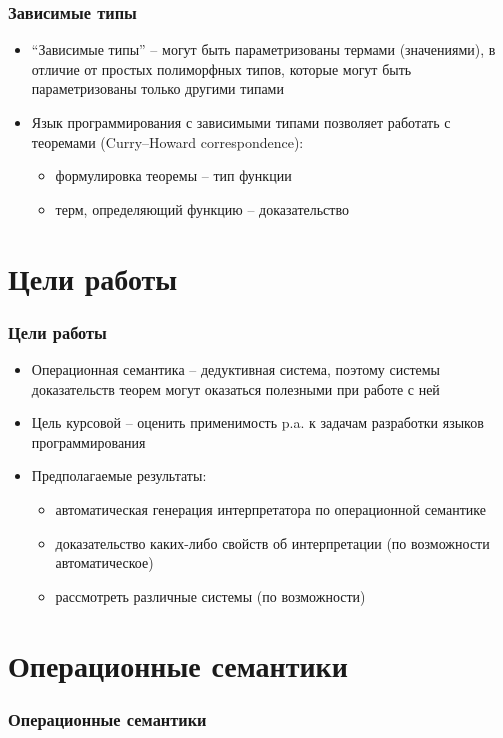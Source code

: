 \documentclass[12pt,pdf,hyperref={unicode}]{beamer}
\begin{document}
      \begin{frame}
         \frametitle{Зависимые типы}
         \begin{itemize}
            \item ``Зависимые типы'' -- могут быть параметризованы термами (значениями),
             в отличие от простых полиморфных типов, которые могут быть
             параметризованы только другими типами
            \item Язык программирования с зависимыми типами позволяет работать
             с теоремами (Curry--Howard correspondence):
               \begin{itemize}
                  \item формулировка теоремы -- тип функции
                  \item терм, определяющий функцию -- доказательство
               \end{itemize}
         \end{itemize}
      \end{frame}

      \section{Цели работы}
      \begin{frame}
         \frametitle{Цели работы}
         \begin{itemize}
            \item Операционная семантика -- дедуктивная система, поэтому
             системы доказательств теорем могут оказаться полезными при работе с ней
            \item Цель курсовой -- оценить применимость p.a. к задачам разработки языков программирования
            \item Предполагаемые результаты:
            \begin{itemize}
               \item автоматическая генерация интерпретатора по операционной семантике
               \item доказательство каких-либо свойств об интерпретации (по возможности автоматическое)
               \item рассмотреть различные системы (по возможности)
            \end{itemize}
         \end{itemize}
      \end{frame}

      \section{Операционные семантики}
      \begin{frame}
         \frametitle{Операционные семантики}
         \begin{itemize}
         \end{itemize}
      \end{frame}

  
\end{document}
